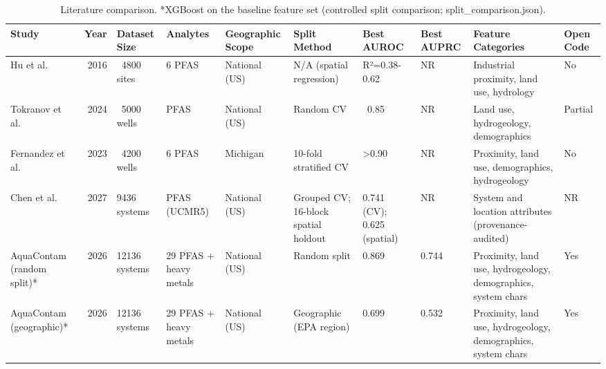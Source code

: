 \begin{table}
\caption{Literature comparison. *XGBoost on the baseline feature set (controlled split comparison; split_comparison.json).}
\label{tab:ext-literature}
\begin{tabular}{lrllllllll}
\toprule
Study & Year & Dataset Size & Analytes & Geographic Scope & Split Method & Best AUROC & Best AUPRC & Feature Categories & Open Code \\
\midrule
Hu et al. & 2016 & ~4800 sites & 6 PFAS & National (US) & N/A (spatial regression) & R²=0.38-0.62 & NR & Industrial proximity, land use, hydrology & No \\
Tokranov et al. & 2024 & ~5000 wells & PFAS & National (US) & Random CV & ~0.85 & NR & Land use, hydrogeology, demographics & Partial \\
Fernandez et al. & 2023 & ~4200 wells & 6 PFAS & Michigan & 10-fold stratified CV & >0.90 & NR & Proximity, land use, demographics, hydrogeology & No \\
Chen et al. & 2027 & 9436 systems & PFAS (UCMR5) & National (US) & Grouped CV; 16-block spatial holdout & 0.741 (CV); 0.625 (spatial) & NR & System and location attributes (provenance-audited) & NR \\
AquaContam (random split)* & 2026 & 12136 systems & 29 PFAS + heavy metals & National (US) & Random split & 0.869 & 0.744 & Proximity, land use, hydrogeology, demographics, system chars & Yes \\
AquaContam (geographic)* & 2026 & 12136 systems & 29 PFAS + heavy metals & National (US) & Geographic (EPA region) & 0.699 & 0.532 & Proximity, land use, hydrogeology, demographics, system chars & Yes \\
\bottomrule
\end{tabular}
\end{table}
